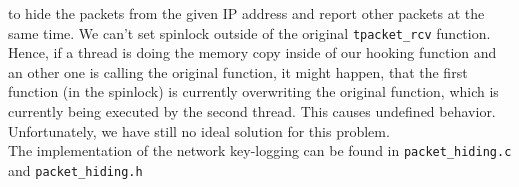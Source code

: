 to hide the packets from the given IP address and report other packets at the
same time. We can't set spinlock outside of the original \texttt{tpacket\_rcv} function. Hence, if a thread is doing the memory copy inside of our hooking function and an other one is calling the original function, it might happen, that the first function (in the spinlock) is currently overwriting the original function, which is currently being executed by the second thread. This causes undefined behavior. 
Unfortunately, we have still no ideal solution for this problem.
\\
The implementation of the network key-logging can be found in 
\verb+packet_hiding.c+ and \verb+packet_hiding.h+\\ 
